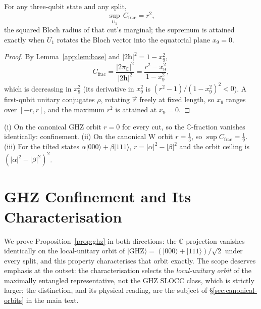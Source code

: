 \begin{lemma}\label{app:lem:ceiling}
For any three-qubit state and any split,
\begin{equation}
  \sup_{U_1}\,C_{\mathrm{frac}} = r^2,
\end{equation}
the squared Bloch radius of that cut's marginal; the supremum is attained exactly when $U_1$ rotates
the Bloch vector into the equatorial plane $x_9 = 0$.
\end{lemma}

\begin{proof}
By Lemma~\ref{app:lem:base} and $|2\mathbf{h}|^2 = 1-x_9^2$,
\begin{equation}
  C_{\mathrm{frac}} = \frac{|2\pi_{\mathbb{C}}|^2}{|2\mathbf{h}|^2}
  = \frac{r^2 - x_9^2}{1 - x_9^2},
\end{equation}
which is decreasing in $x_9^2$ (its derivative in $x_9^2$ is $(r^2-1)/(1-x_9^2)^2 < 0$). A
first-qubit unitary conjugates $\rho$, rotating $\vec r$ freely at fixed length, so $x_9$ ranges over
$[-r,r]$, and the maximum $r^2$ is attained at $x_9 = 0$.
\end{proof}

\begin{corollary}[Instances]\label{app:cor:instances}
(i) On the canonical GHZ orbit $r = 0$ for every cut, so the $\mathbb{C}$-fraction vanishes
identically: confinement. (ii) On the canonical W orbit $r = \tfrac13$, so
$\sup C_{\mathrm{frac}} = \tfrac19$. (iii) For the tilted states
$\alpha\lvert000\rangle+\beta\lvert111\rangle$, $r = |\alpha|^2-|\beta|^2$ and the orbit ceiling is
$(|\alpha|^2-|\beta|^2)^2$.
\end{corollary}

\section{GHZ Confinement and Its Characterisation}
\label{app:ghz-proof}

We prove Proposition~\ref{prop:ghz} in both directions: the $\mathbb{C}$-projection vanishes
identically on the local-unitary orbit of
$\lvert\mathrm{GHZ}\rangle = (\lvert000\rangle+\lvert111\rangle)/\sqrt2$ under every split, and this
property characterises that orbit exactly. The scope deserves emphasis at the outset: the
characterisation selects the \emph{local-unitary orbit} of the maximally entangled representative,
not the GHZ SLOCC class, which is strictly larger; the distinction, and its physical reading, are
the subject of \S\ref{sec:canonical-orbits} in the main text.

